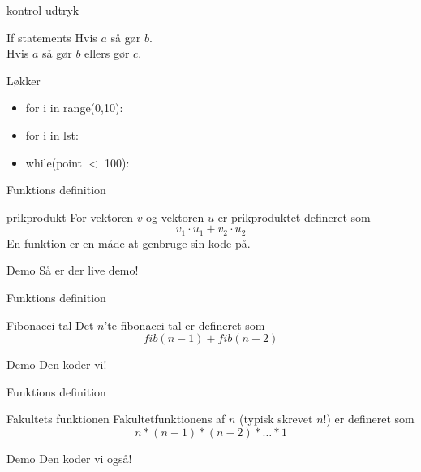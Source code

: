 \documentclass[12pt,t]{beamer}
\begin{document}
    \begin{frame}[t]{kontrol udtryk}
        \begin{block}{If statements}
            Hvis $a$ så gør $b$. \\
            Hvis $a$ så gør $b$ ellers gør $c$.
        \end{block}
        \begin{block}{Løkker}
            \begin{itemize}
                \item for i in range(0,10):
                \pause \item for i in lst:
                \pause \item while(point $<$ 100):
            \end{itemize}
    \end{block}
    \end{frame}


    \begin{frame}{Funktions definition}
            \begin{block}{prikprodukt}
                For vektoren $v$ og vektoren $u$ er prikproduktet defineret som
                $$
                    v_1 \cdot u_1 + v_2 \cdot u_2
                $$
                En funktion er en måde at genbruge sin kode på.
            \end{block}
                \pause
            \begin{block}{Demo}
                 Så er der live demo!
            \end{block}
    \end{frame}


    \begin{frame}{Funktions definition}
            \begin{block}{Fibonacci tal}
                Det $n$'te fibonacci tal er defineret som
                $$
                    fib(n-1) + fib(n-2)
                $$
            \end{block}
            \pause
            \begin{block}{Demo}
                 Den koder vi!
            \end{block}
    \end{frame}


    \begin{frame}{Funktions definition}
        \begin{block}{Fakultets funktionen}
            Fakultetfunktionens af $n$ (typisk skrevet $n!$) er defineret som
            $$
                n * (n-1) * (n-2) * \dots * 1
            $$
        \end{block}

        \begin{block}{Demo}
             Den koder vi også!
        \end{block}
    \end{frame}
\end{document}

